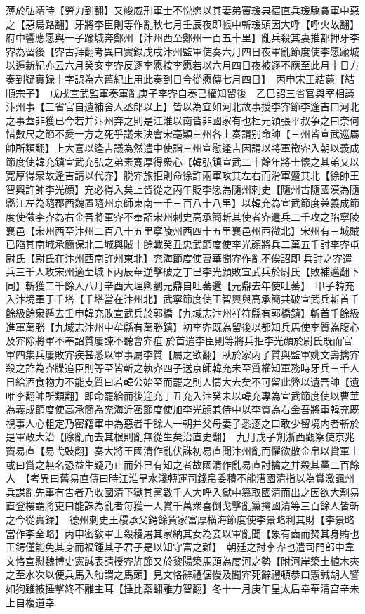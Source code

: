 薄於弘靖時【勞力到翻】又峻威刑軍士不悦愿以其妻弟竇瑗典宿直兵瑗驕貪軍中惡之【惡烏路翻】牙將李臣則等作亂秋七月壬辰夜即帳中斬瑗頭因大呼【呼火故翻】府中響應愿與一子踰城奔鄭州【汴州西至鄭州一百五十里】亂兵殺其妻推都押牙李㝏為留後【㝏古拜翻考異曰實録戊戌汴州監軍使奏六月四日夜軍亂節度使李愿踰城以遁新紀亦云六月癸亥李㝏反逐李愿按李愿若以六月四日夜被逐不應至此月十日方奏到疑實録十字誤為六舊紀止用此奏到日今從愿傳七月四日】　丙申宋王結薨【結順宗子】　戊戌宣武監軍奏軍亂庚子李㝏自奏已權知留後　乙巳詔三省官與宰相議汴州事【三省官自遺補舍人丞郎以上】皆以為宜如河北故事授李㝏節李逢吉曰河北之事蓋非獲已今若并汴州弃之則是江淮以南皆非國家有也杜元穎張平叔争之曰奈何惜數尺之節不愛一方之死乎議未決會宋亳穎三州各上奏請别命帥【三州皆宣武巡屬帥所類翻】上大喜以逢吉議為然遣中使詣三州宣慰逢吉因請以將軍徵㝏入朝以義成節度使韓充鎮宣武充弘之弟素寛厚得衆心【韓弘鎮宣武二十餘年將士懷之其弟又以寛厚得衆故逢吉請以代㝏】脱㝏旅拒則命徐許兩軍攻其左右而滑軍蹙其北【徐帥王智興許帥李光顔】充必得入矣上皆從之丙午貶李愿為隨州刺史【隨州古隨國漢為隨縣江左為隨郡西魏置隨州京師東南一千三百八十八里】以韓充為宣武節度兼義成節度使徵李㝏為右金吾將軍㝏不奉詔宋州刺史高承簡斬其使者㝏遣兵二千攻之陷寧陵襄邑【宋州西至汴州二百八十五里寧陵州西四十五里襄邑州西微北】宋州有三城賊已陷其南城承簡保北二城與賊十餘戰癸丑忠武節度使李光顔將兵二萬五千討李㝏屯尉氏【尉氏在汴州西南許州東北】兖海節度使曹華聞㝏作亂不俟詔即兵討之㝏遣兵三千人攻宋州適至城下丙辰華逆擊破之丁巳李光顔敗宣武兵於尉氏【敗補邁翻下同】斬獲二千餘人八月辛酉大理卿劉元鼎自吐蕃還【元鼎去年使吐蕃】　甲子韓充入汴境軍于千塔【千塔當在汴州北】武寧節度使王智興與高承簡共破宣武兵斬首千餘級餘衆遁去壬申韓充敗宣武兵於郭橋【九域志汴州祥符縣有郭橋鎮】斬首千餘級進軍萬勝【九域志汴州中牟縣有萬勝鎮】初李㝏既為留後以都知兵馬使李質為腹心及㝏除將軍不奉詔質屢諫不聽會㝏疽於首遣李臣則等將兵拒李光顔於尉氏既而官軍四集兵屢敗㝏疾甚悉以軍事屬李質【屬之欲翻】臥於家丙子質與監軍姚文壽擒㝏殺之詐為㝏牒追臣則等至皆斬之執㝏四子送京師韓充未至質權知軍務時牙兵三千人日給酒食物力不能支質曰若韓公始至而罷之則人情大去矣不可留此弊以遺吾帥【遺唯李翻帥所類翻】即命罷給而後迎充丁丑充入汴癸未以韓充專為宣武節度使以曹華為義成節度使高承簡為兖海沂密節度使加李光顔兼侍中以李質為右金吾將軍韓充既視事人心粗定乃密籍軍中為惡者千餘人一朝并父母妻子悉逐之曰敢少留境内者斬於是軍政大治【除亂而去其根則亂無從生矣治直史翻】　九月戊子朔浙西觀察使京兆竇易直【易弋豉翻】奏大將王國清作亂伏誅初易直聞汴州亂而懼欲散金帛以賞軍士或曰賞之無名恐益生疑乃止而外已有知之者故國清作亂易直討擒之并殺其黨二百餘人　【考異曰舊易直傳曰時江淮旱水淺轉運司錢帛委積不能漕國清指以為賞激諷州兵謀亂先事有告者乃收國清下獄其黨數千人大呼入獄中篡取國清而出之因欲大剽易直登樓謂將吏曰能誅為亂者每獲一人賞千萬衆喜倒戈擊亂黨擒國清等三百餘人皆斬之今從實録】　德州刺史王稷承父鍔餘貲家富厚横海節度使李景略利其財【李景略當作李全略】丙申密敎軍士殺稷屠其家納其女為妾以軍亂聞【象有齒而焚其身賄也王鍔僅能免其身而禍鍾其子君子是以知守富之難】　朝廷之討李㝏也遣司門郎中韋文恪宣慰魏博史憲誠表請授㝏旌節又於黎陽築馬頭為度河之勢【附河岸築土植木夾之至水次以便兵馬入船謂之馬頭】見文恪辭禮倨慢及聞㝏死辭禮頓恭曰憲誠胡人譬如狗雖被捶擊終不離主耳【捶比蘂翻離力智翻】冬十一月庚午皇太后幸華清宫辛未上自複道幸


